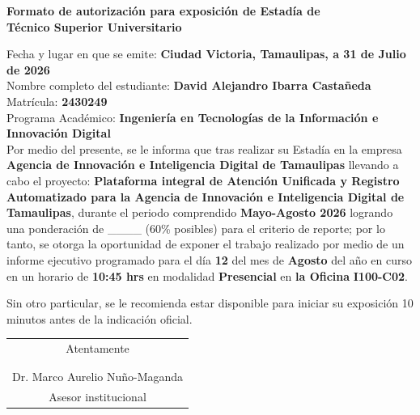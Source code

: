 \documentclass[12pt]{article}
\newcommand{\NombreAlumno}{David Alejandro Ibarra Castañeda}
\newcommand{\NombreProyecto}{Plataforma integral de Atención Unificada y Registro Automatizado para la Agencia de Innovación e Inteligencia Digital de Tamaulipas}
\newcommand{\UnidadEconomica}{Agencia de Innovación e Inteligencia Digital de Tamaulipas}
\newcommand{\nasesorinstitucional}{Dr. Marco Aurelio Nuño-Maganda}
\newcommand{\Matricula}           {2430249}  %
\newcommand{\ncuatrimestre}{Mayo-Agosto 2026}
\newcommand{\fechaAutorizacionInforme}               {31 de Julio de 2026}
\newcommand{\DiaEvaluacionPesentacion}{12}
\newcommand{\MesEvaluacionPesentacion}{Agosto}
\newcommand{\HoraEvaluacionPesentacion}{10:45 hrs}
\newcommand{\modalidadEvaluacionPesentacion}{Presencial} %
\newcommand{\tipoAulaOficinaEnlacePesentacion}{la Oficina} %
\newcommand{\AulaEvaluacionOEnlaceMeetPesentacion}{I100-C02} %
\newcommand{\ncarrera}            {Ingeniería en Tecnologías de la Información e Innovación Digital}
\begin{document}
\begin{center}
{\Large \textbf{Formato de autorización para exposición de Estadía de}}\\[0.125cm]
{\Large \textbf{Técnico Superior Universitario}}\\[0.25cm]
\end{center}

\noindent
Fecha y lugar en que se emite: \textbf{Ciudad Victoria, Tamaulipas, a \fechaAutorizacionInforme } \\[0.125cm]
Nombre completo del estudiante: \textbf{\NombreAlumno} \\[0.125cm]
Matrícula: \textbf{\Matricula}  \\[0.125cm]
Programa Académico: \textbf{\ncarrera}  \\[0.25cm]

\noindent
Por medio del presente, se le informa que tras realizar su Estadía en la empresa \textbf{\UnidadEconomica} llevando a cabo el proyecto: \textbf{\NombreProyecto}, durante el periodo comprendido \textbf{\ncuatrimestre} logrando una ponderación de \_\_\_\_  (60\% posibles) para el criterio de reporte; por lo tanto, se otorga la oportunidad de exponer el trabajo realizado por medio de un informe ejecutivo programado para el día \textbf{\DiaEvaluacionPesentacion} del mes de \textbf{\MesEvaluacionPesentacion} del año en curso en un horario de \textbf{\HoraEvaluacionPesentacion} en modalidad \textbf{\modalidadEvaluacionPesentacion} en \textbf{\tipoAulaOficinaEnlacePesentacion} \textbf{\AulaEvaluacionOEnlaceMeetPesentacion}.

\vspace{0.25cm}

\noindent
Sin otro particular, se le recomienda estar disponible para iniciar su exposición 10 minutos antes de la indicación oficial.

\vspace{0.5cm}

\begin{center}
\begin{tabular}{p{10cm}}
\multicolumn{1}{c}{Atentamente}   \\
 \\
 \\ \hline
\multicolumn{1}{c}{\nasesorinstitucional}   \\
\multicolumn{1}{c}{Asesor institucional}   \\
\end{tabular}
\end{center}
\end{document}
